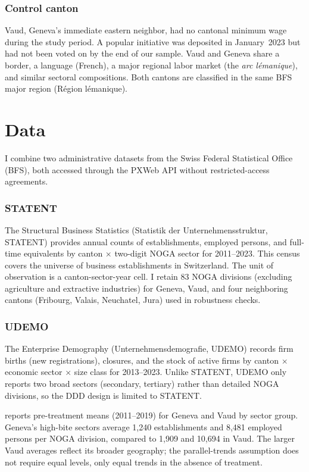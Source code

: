 \documentclass[12pt]{article}
\begin{document}
\subsubsection*{Control canton} Vaud, Geneva's immediate eastern neighbor, had no cantonal minimum wage during the study period. A popular initiative was deposited in January~2023 but had not been voted on by the end of our sample. Vaud and Geneva share a border, a language (French), a major regional labor market (the \textit{arc lémanique}), and similar sectoral compositions. Both cantons are classified in the same BFS major region (Région lémanique).


\section{Data}
\label{sec:data}

I combine two administrative datasets from the Swiss Federal Statistical Office (BFS), both accessed through the PXWeb API without restricted-access agreements.

\subsubsection*{STATENT} The Structural Business Statistics (Statistik der Unternehmensstruktur, STATENT) provides annual counts of establishments, employed persons, and full-time equivalents by canton $\times$ two-digit NOGA sector for 2011--2023. This census covers the universe of business establishments in Switzerland. The unit of observation is a canton-sector-year cell. I retain 83 NOGA divisions (excluding agriculture and extractive industries) for Geneva, Vaud, and four neighboring cantons (Fribourg, Valais, Neuchatel, Jura) used in robustness checks.

\subsubsection*{UDEMO} The Enterprise Demography (Unternehmensdemografie, UDEMO) records firm births (new registrations), closures, and the stock of active firms by canton $\times$ economic sector $\times$ size class for 2013--2023. Unlike STATENT, UDEMO only reports two broad sectors (secondary, tertiary) rather than detailed NOGA divisions, so the DDD design is limited to STATENT.



 reports pre-treatment means (2011--2019) for Geneva and Vaud by sector group. Geneva's high-bite sectors average 1,240 establishments and 8,481 employed persons per NOGA division, compared to 1,909 and 10,694 in Vaud. The larger Vaud averages reflect its broader geography; the parallel-trends assumption does not require equal levels, only equal trends in the absence of treatment.
\end{document}
